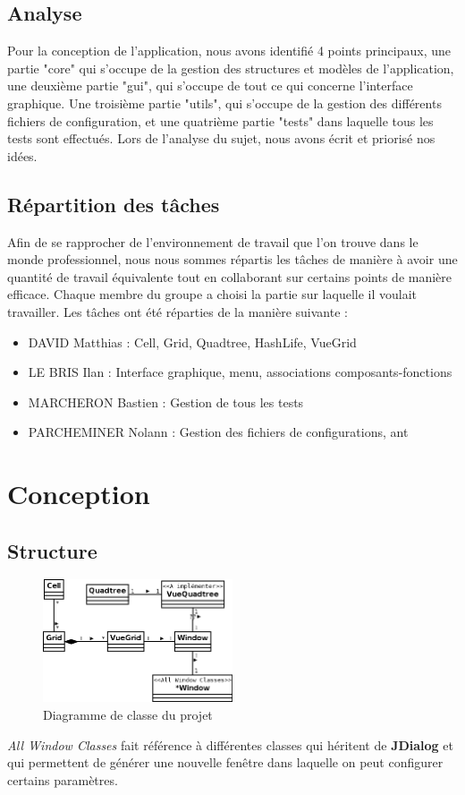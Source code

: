 \documentclass[12pt]{article}
\begin{document}
		\subsection{Analyse}
			Pour la conception de l’application, nous avons identifié 4 points principaux, une partie "core" qui s'occupe de la gestion des structures 
			et modèles de l'application, une deuxième partie "gui", qui s'occupe de tout ce qui concerne l'interface graphique. 
			Une troisième partie "utils", qui s'occupe de la gestion des différents fichiers de configuration, et une quatrième partie "tests" 
			dans laquelle tous les tests sont effectués. Lors de l'analyse du sujet, nous avons écrit et priorisé nos idées.
		\subsection{Répartition des tâches}
			Afin de se rapprocher de l'environnement de travail que l'on trouve dans le monde professionnel, nous nous sommes 
			répartis les tâches de manière à avoir une quantité de travail équivalente tout en collaborant sur certains points de manière efficace.
			Chaque membre du groupe a choisi la partie sur laquelle il voulait travailler. Les tâches ont été réparties de la manière suivante :
			\begin{itemize}
				\item DAVID Matthias : Cell, Grid, Quadtree, HashLife, VueGrid
				\item LE BRIS Ilan : Interface graphique, menu, associations composants-fonctions
				\item MARCHERON Bastien : Gestion de tous les tests
				\item PARCHEMINER Nolann : Gestion des fichiers de configurations, ant
			\end{itemize}

	
	\section{Conception}
		\subsection{Structure}
			\begin{figure}[!h]
				\centering
				\includegraphics[width=0.5\textwidth]{images/diagramme.png}
				\caption{Diagramme de classe du projet}
			\end{figure}
			\emph{All Window Classes} fait référence à différentes classes qui héritent de \textbf{JDialog} et qui permettent de générer une nouvelle fenêtre dans laquelle on peut configurer certains paramètres.
		
\end{document}
